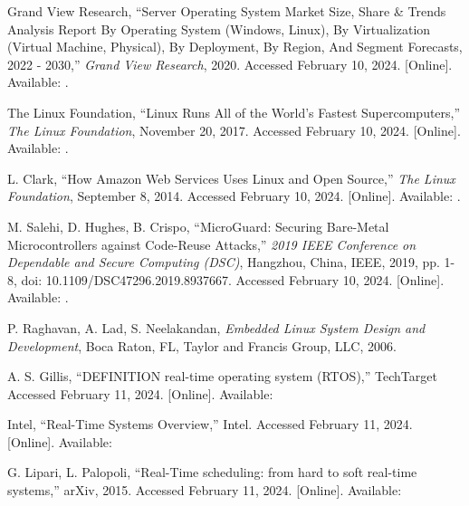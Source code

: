 \begin{thebibliography}{99}
        Grand View Research,
        ``Server Operating System Market Size, Share \& Trends Analysis Report By Operating System (Windows, Linux), By Virtualization (Virtual Machine, Physical), By Deployment, By Region, And Segment Forecasts, 2022 - 2030,''
        \textit{Grand View Research}, 2020.
        Accessed February 10, 2024.
        [Online].
        Available: .

        The Linux Foundation,
        ``Linux Runs All of the World's Fastest Supercomputers,''
        \textit{The Linux Foundation}, November 20, 2017.
        Accessed February 10, 2024.
        [Online].
        Available: .

        L. Clark,
        ``How Amazon Web Services Uses Linux and Open Source,''
        \textit{The Linux Foundation}, September 8, 2014.
        Accessed February 10, 2024.
        [Online].
        Available: .

        M. Salehi, D. Hughes, B. Crispo,
        ``MicroGuard: Securing Bare-Metal Microcontrollers against Code-Reuse Attacks,''
        \textit{2019 IEEE Conference on Dependable and Secure Computing (DSC)},
        Hangzhou, China, IEEE, 2019, pp. 1-8, doi: 10.1109/DSC47296.2019.8937667.
        Accessed February 10, 2024.
        [Online].
        Available: .

        P. Raghavan, A. Lad, S. Neelakandan,
        \textit{Embedded Linux System Design and Development},
        Boca Raton, FL, Taylor and Francis Group, LLC, 2006.

        A. S. Gillis,
        ``DEFINITION real-time operating system (RTOS),''
        TechTarget
        Accessed February 11, 2024.
        [Online].
        Available: 

        Intel,
        ``Real-Time Systems Overview,''
        Intel.
        Accessed February 11, 2024.
        [Online].
        Available: 

        G. Lipari, L. Palopoli,
        ``Real-Time scheduling: from hard to soft real-time systems,''
        arXiv, 2015.
        Accessed February 11, 2024.
        [Online].
        Available: 

\end{thebibliography}
